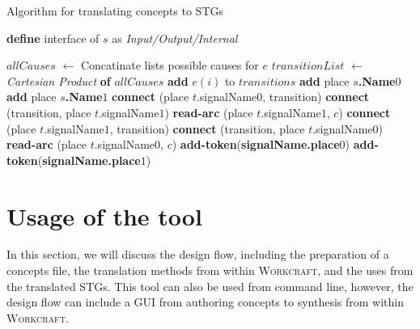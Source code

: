 \documentclass[british,conference,compsoc]{IEEEtran}
\newcommand{\noun}[1]{\textsc{#1}}
\begin{document}
\begin{algorithm}[t]
\begin{algorithmic}
\caption{Algorithm for translating concepts to STGs\label{alg:translation}}
  \State \textbf{define} interface of $s$ as \emph{Input/Output/Internal}
\EndFor

  \State $allCauses$ $\leftarrow$ Concatinate lists  possible causes for $e$
  \State $transitionList$ $\leftarrow$ \emph{Cartesian Product} \textbf{of} 
	$allCauses$
    \State \textbf{add} $e(i)$ to $transitions$
  \EndFor 
\EndFor
{}
  \State \textbf{add} place \textbf{$s$.Name}$0$
  \State \textbf{add} place \textbf{$s$.Name}$1$
\EndFor
{}
    \State \textbf{connect} (place $t$.signalName$0$, transition)
    \State \textbf{connect} (transition, place $t$.signalName$1$)
      \State \textbf{read-arc} (place $t$.signalName$1$, $c$)
    \EndFor
  \EndIf
    \State \textbf{connect} (place $t$.signalName$1$, transition)
    \State \textbf{connect} (transition, place $t$.signalName$0$)
      \State \textbf{read-arc} (place $t$.signalName$0$, $c$)
    \EndFor
  \EndIf
\EndFor
{}
    \State \textbf{add-token}(\textbf{signalName.place}$0$)
  \EndIf 
    \State \textbf{add-token}(\textbf{signalName.place}$1$)
  \EndIf
\EndFor
\end{algorithmic}
\end{algorithm}


\section{Usage of the tool\label{sec:tool-use}}

\vspace{-2mm}


In this section, we will discuss the design flow, including the preparation of 
a concepts file, the translation methods from within \noun{Workcraft}, and 
the uses from the translated STGs. This tool can also be used from command line,
however, the design flow can include a GUI from authoring concepts to synthesis
from within \noun{Workcraft}. 
\end{document}
